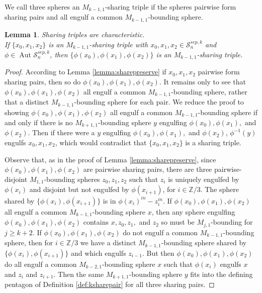 \documentclass[11pt]{article}
\newcommand{\Z}{\mathbb{Z}}
\DeclareMathOperator{\aaut}{Aut}
\newtheorem{lemma}[theorem]{Lemma}
\theoremstyle{remark}
\theoremstyle{definition}
\begin{document}
We call three spheres an $M_{k-1,1}$-sharing triple if
the spheres pairwise form sharing pairs and all engulf
a common $M_{k-1,1}$-bounding sphere.

\begin{lemma}
  Sharing triples are characteristic.\\
  If $\{x_0,x_1,x_2\}$ is an $M_{k-1,1}$-sharing triple with $x_0,x_1,x_2 \in \mathcal S^{sep,k}_n$
  and $\phi \in \aaut \mathcal S^{sep,k}_n$,
  then $\{\phi(x_0),\phi(x_1),\phi(x_2)\}$ is an $M_{k-1,1}$-sharing triple.
  \label{lemma:sharetrippreserve}
\end{lemma}

\begin{proof}
  According to Lemma \ref{lemma:sharepreserve}
  if $x_0,x_1,x_2$ pairwise form sharing pairs,
  then so do $\phi(x_0),\phi(x_1),\phi(x_2)$.
  It remains only to see that
  $\phi(x_0),\phi(x_1),\phi(x_2)$ all engulf a
  common $M_{k-1,1}$-bounding sphere, rather that a distinct
  $M_{k-1,1}$-bounding sphere for each pair.
  We reduce the proof to showing
  $\phi(x_0),\phi(x_1),\phi(x_2)$ all engulf a
  common $M_{k-1,1}$-bounding sphere if and only if there is
  no $M_{k+1,1}$-bounding sphere $y$ engulfing
  $\phi(x_0),\phi(x_1),$ and $\phi(x_2)$.
  Then if there were a $y$ engulfing $\phi(x_0),\phi(x_1),$ and $\phi(x_2)$,
  $\phi^{-1}(y)$ engulfs $x_0,x_1,x_2$, which would contradict that
  $\{x_0,x_1,x_2\}$ is a sharing triple.

  Observe that, as in the proof of Lemma \ref{lemma:sharepreserve},
  since $\phi(x_0),\phi(x_1),\phi(x_2)$
  are pairwise sharing pairs,
  there are three pairwise-disjoint $M_{1,1}$-bounding spheres $z_0,z_1,z_2$
  such that $z_i$ is uniquely engulfed by $\phi(x_i)$ and disjoint
  but not engulfed by $\phi(x_{i+1})$, for $i \in \Z/3$.
  The sphere shared by $\{\phi(x_i),\phi(x_{i+1})\}$
  is in $\phi(x_i)^{in}-z_i^{in}$.
  If $\phi(x_0),\phi(x_1),\phi(x_2)$ all engulf a
  common $M_{k-1,1}$-bounding sphere $x$,
  then any sphere engulfing $\phi(x_0),\phi(x_1),\phi(x_2)$
  contains $x,z_0,z_1,$ and $z_2$ so must be $M_{j,1}$-bounding for $j\geq k+2$.
  If $\phi(x_0),\phi(x_1),\phi(x_2)$ do not engulf
  a common $M_{k-1,1}$-bounding sphere,
  then for $i \in \Z/3$
  we have a distinct $M_{k-1,1}$-bounding sphere
  shared by
  $\{\phi(x_i),\phi(x_{i+1})\}$ and which engulfs $z_{i-1}$.
  But then
  $\phi(x_0),\phi(x_1),\phi(x_2)$ do all engulf
  a common $M_{k-2,1}$-bounding sphere $x$
  such that $\phi(x_i)$ engulfs $x$ and $z_i$ and $z_{i+1}$.
  Then the same $M_{k+1,1}$-bounding sphere $y$ fits into the defining pentagon
  of Definition \ref{def:ksharepair}
  for all three sharing pairs.
\end{proof}
\end{document}

